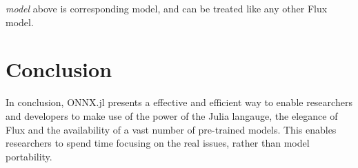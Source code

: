 \documentclass{juliacon}
\begin{document}
\textit{model} above is corresponding model, and can be treated like any other Flux model. 

\section{Conclusion}
In conclusion, ONNX.jl presents a effective and efficient way to enable researchers and developers to make use of the power of the Julia langauge, the elegance of Flux and the availability of a vast number of pre-trained models. This enables researchers to spend time focusing on the real issues, rather than model portability.



\end{document}
